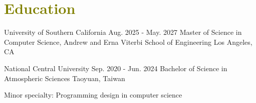 

\section{\textcolor{olive}{\textbf{Education}}}
	\resumeSubHeadingListStart
		
    \resumeSubheading
        {University of Southern California}
        {Aug. 2025 - May. 2027}
        {Master of Science in Computer Science, Andrew and Erna Viterbi School of Engineering}
        {\textcolor{gray}{\footnotesize{\faMapMarker}} Los Angeles, CA}

        \resumeItemListStart

        \resumeItemListEnd
		
    \resumeSubheading
        {National Central University}
        {Sep. 2020 - Jun. 2024}
        {Bachelor of Science in Atmospheric Sciences \myScore}
        {\textcolor{gray}{\footnotesize{\faMapMarker}} Taoyuan, Taiwan}
		
    \resumeItemListStart
        \item {
            Minor specialty: Programming design in computer science
        }
    \resumeItemListEnd
		  
	\resumeSubHeadingListEnd
